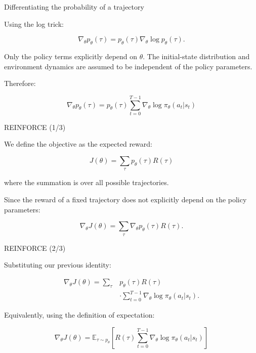 \documentclass{beamer}
\begin{document}
\begin{frame}{Differentiating the probability of a trajectory}
	\begin{flushleft}
		
		Using the log trick:
		
		\[
		\nabla_\theta p_\theta(\tau)
		=
		p_\theta(\tau)
		\nabla_\theta\log p_\theta(\tau).
		\]
		
		Only the policy terms explicitly depend on $\theta$.
		The initial-state distribution and environment dynamics
		are assumed to be independent of the policy parameters.
		
		Therefore:
		
		\[
		\boxed{
			\nabla_\theta p_\theta(\tau)
			=
			p_\theta(\tau)
			\sum_{t=0}^{T-1}
			\nabla_\theta\log\pi_\theta(a_t|s_t)
		}
		\]
		
	\end{flushleft}
\end{frame}


\begin{frame}{REINFORCE (1/3)}
	\begin{flushleft}
		
		We define the objective as the expected reward:
		
		\[
		\boxed{
			J(\theta)
			=
			\sum_\tau p_\theta(\tau)R(\tau)
		}
		\]
		
		where the summation is over all possible trajectories.
		
		Since the reward of a fixed trajectory does not
		explicitly depend on the policy parameters:
		
		\[
		\nabla_\theta J(\theta)
		=
		\sum_\tau
		\nabla_\theta p_\theta(\tau)R(\tau).
		\]
		
	\end{flushleft}
\end{frame}


\begin{frame}{REINFORCE (2/3)}
	\begin{flushleft}
		
		Substituting our previous identity:
		
		\[
		\begin{aligned}
			\nabla_\theta J(\theta)
			=
			\sum_\tau
			&p_\theta(\tau)R(\tau)\\
			&\cdot
			\sum_{t=0}^{T-1}
			\nabla_\theta\log\pi_\theta(a_t|s_t).
		\end{aligned}
		\]
		
		Equivalently, using the definition of expectation:
		
		\[
		\boxed{
			\nabla_\theta J(\theta)
			=
			\mathbb{E}_{\tau\sim p_\theta}
			\left[
			R(\tau)
			\sum_{t=0}^{T-1}
			\nabla_\theta\log\pi_\theta(a_t|s_t)
			\right]
		}
		\]
		
	\end{flushleft}
\end{frame}
\end{document}
